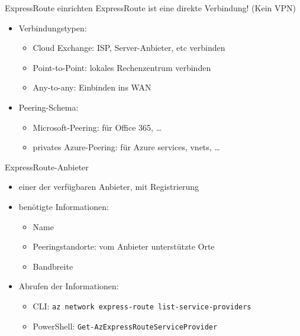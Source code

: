 \begin{flashcard}[Definition]{ExpressRoute einrichten}
    ExpressRoute ist eine direkte Verbindung! (Kein VPN)
    \begin{itemize}
        \item Verbindungstypen:
            \begin{itemize}
                \item Cloud Exchange: ISP, Server-Anbieter, etc verbinden
                \item Point-to-Point: lokales Rechenzentrum verbinden
                \item Any-to-any: Einbinden ins WAN
            \end{itemize}
        \item Peering-Schema:
            \begin{itemize}
                \item Microsoft-Peering: für Office 365, \ldots
                \item privates Azure-Peering: für Azure services, vnets, \ldots
            \end{itemize}
    \end{itemize}
\end{flashcard}

\begin{flashcard}[Definition]{ExpressRoute-Anbieter}
    \begin{itemize}
        \item einer der verfügbaren Anbieter, mit Registrierung
        \item benötigte Informationen:
            \begin{itemize}
                \item Name
                \item Peeringstandorte: vom Anbieter unterstützte Orte
                \item Bandbreite
            \end{itemize}
        \item Abrufen der Informationen:
            \begin{itemize}
                \item CLI:\newline
                    \texttt{az network express-route list-service-providers}
                \item PowerShell:\newline
                    \texttt{Get-AzExpressRouteServiceProvider}
            \end{itemize}
    \end{itemize}
\end{flashcard}

